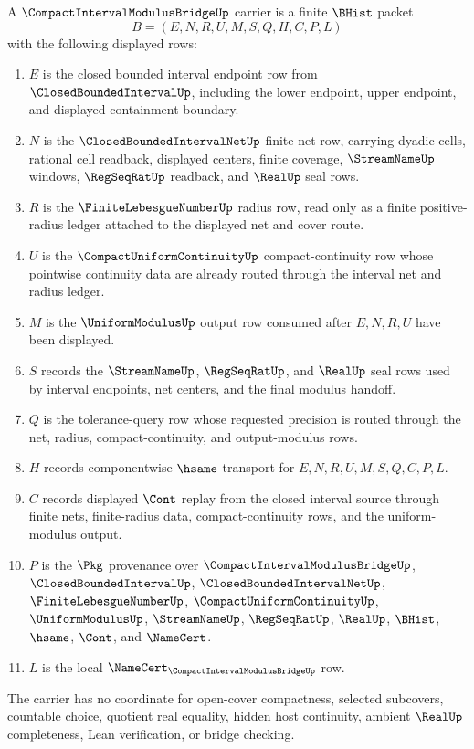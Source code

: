 \begin{definition}
\label{def:compact-interval-modulus-bridge-carrier}
A $\CompactIntervalModulusBridgeUp$ carrier is a finite $\BHist$ packet
$$
B=(E,N,R,U,M,S,Q,H,C,P,L)
$$
with the following displayed rows:
\begin{enumerate}
\item $E$ is the closed bounded interval endpoint row from $\ClosedBoundedIntervalUp$, including the lower endpoint, upper endpoint, and displayed containment boundary.
\item $N$ is the $\ClosedBoundedIntervalNetUp$ finite-net row, carrying dyadic cells, rational cell readback, displayed centers, finite coverage, $\StreamNameUp$ windows, $\RegSeqRatUp$ readback, and $\RealUp$ seal rows.
\item $R$ is the $\FiniteLebesgueNumberUp$ radius row, read only as a finite positive-radius ledger attached to the displayed net and cover route.
\item $U$ is the $\CompactUniformContinuityUp$ compact-continuity row whose pointwise continuity data are already routed through the interval net and radius ledger.
\item $M$ is the $\UniformModulusUp$ output row consumed after $E,N,R,U$ have been displayed.
\item $S$ records the $\StreamNameUp$, $\RegSeqRatUp$, and $\RealUp$ seal rows used by interval endpoints, net centers, and the final modulus handoff.
\item $Q$ is the tolerance-query row whose requested precision is routed through the net, radius, compact-continuity, and output-modulus rows.
\item $H$ records componentwise $\hsame$ transport for $E,N,R,U,M,S,Q,C,P,L$.
\item $C$ records displayed $\Cont$ replay from the closed interval source through finite nets, finite-radius data, compact-continuity rows, and the uniform-modulus output.
\item $P$ is the $\Pkg$ provenance over $\CompactIntervalModulusBridgeUp$, $\ClosedBoundedIntervalUp$, $\ClosedBoundedIntervalNetUp$, $\FiniteLebesgueNumberUp$, $\CompactUniformContinuityUp$, $\UniformModulusUp$, $\StreamNameUp$, $\RegSeqRatUp$, $\RealUp$, $\BHist$, $\hsame$, $\Cont$, and $\NameCert$.
\item $L$ is the local $\NameCert_{\CompactIntervalModulusBridgeUp}$ row.
\end{enumerate}
The carrier has no coordinate for open-cover compactness, selected subcovers, countable choice, quotient real equality, hidden host continuity, ambient $\RealUp$ completeness, Lean verification, or bridge checking.
\end{definition}

